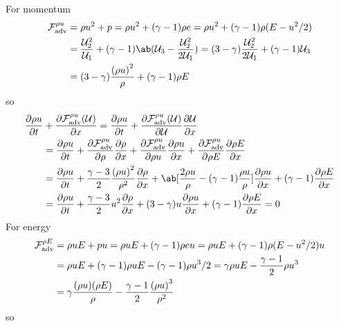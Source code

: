 \documentclass[justified, nobib]{tufte-handout}
\begin{document}
\def\U{\mathcal{U}}
For momentum
\[
	\begin{split}
		\F^{\rho u}
		 & = \rho u^2 + p = \rho u^2 + (\gamma-1)\rho e
		=  \rho u^2 + (\gamma-1)\rho (E - u^2/2)                                 \\
		 & = \frac{\U_2^2}{\U_1} + (\gamma - 1)\ab(\U_3 - \frac{\U_2^2}{2\U_1} )
		= (3-\gamma)\frac{\U_2^2}{2\U_1}  +(\gamma - 1)\U_3                      \\
		 & = (3-\gamma)\frac{{(\rho u)}^2}{\rho} + (\gamma - 1)\rho E
	\end{split}
\]
so
\[
	\begin{split}
		\pdv{\rho u }{t} & + \pdv{\F^{\rho u}(\U)}{x}
		= \pdv{\rho u}{t} + \pdv{\F^{\rho u}(\U)}{\U}\pdv{\U}{x}                                                    \\
		                 & =  \pdv{\rho u}{t}
		+ \pdv{\F^{\rho u}}{\rho }\pdv{\rho }{x}
		+ \pdv{\F^{\rho u}}{\rho u}\pdv{\rho u}{x}
		+ \pdv{\F^{\rho u}}{\rho E}\pdv{\rho E}{x}                                                                  \\
		                 & =  \pdv{\rho u}{t}
		+ \frac{ \gamma - 3 }{2} \frac{{(\rho u)}^2}{\rho^2} \pdv{\rho }{x}
		+ \ab[\frac{2\rho u }{\rho} - (\gamma -1)\frac{\rho u}{\rho} ]\pdv{\rho u}{x} + (\gamma - 1)\pdv{\rho E}{x} \\
		                 & = \pdv{\rho u}{t} + \frac{ \gamma - 3 }{2}u^2\pdv{\rho }{x}
		+ (3 - \gamma)u\pdv{\rho u}{x}
		+ (\gamma - 1 )\pdv{\rho E}{x}
		= 0
	\end{split}
\]
For energy
\[
	\begin{split}
		\mathcal{F}_\mathrm{adv}^{\rho E}
		 & = \rho u E + p u = \rho u E + (\gamma-1)\rho e u
		= \rho u E + (\gamma-1)\rho(E - u^2/2)u                                                 \\
		 & = \rho u E + (\gamma - 1 )\rho u E -(\gamma -1)\rho u^3/2
		= \gamma\rho u E -\frac{\gamma-1}{2} \rho u^3                                           \\
		 & = \gamma\frac{(\rho u)(\rho E)}{\rho} -\frac{\gamma-1}{2}\frac{{(\rho u)}^3}{\rho^2}
	\end{split}
\]
so
\end{document}
